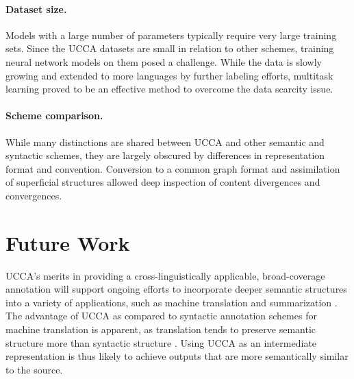 \documentclass[12pt]{article}
\begin{document}
\paragraph{Dataset size.}
Models with a large number of parameters typically require very large
training sets.
Since the UCCA datasets are small in relation to other schemes,
training neural network models on them posed a challenge.
While the data is slowly growing and extended to more languages by further labeling efforts,
multitask learning proved to be an effective method to overcome the data scarcity issue.

\paragraph{Scheme comparison.}
While many distinctions are shared between UCCA and other semantic and syntactic schemes,
they are largely obscured by differences in representation format and convention.
Conversion to a common graph format and assimilation of superficial structures
allowed deep inspection of content divergences and convergences.


\section{Future Work}\label{sec:future_work}
UCCA's merits in providing a cross-linguistically applicable,
broad-coverage annotation will support ongoing efforts to incorporate deeper
semantic structures into a variety of applications, such as machine translation
\cite{jones2012semantics} and summarization \cite{liu2015toward}.
The advantage of UCCA as compared to syntactic annotation schemes for machine translation is apparent,
as translation tends to preserve semantic structure more than syntactic structure \cite{sulem2015conceptual}.
Using UCCA as an intermediate representation is thus likely to achieve outputs that are more
semantically similar to the source.




\end{document}
